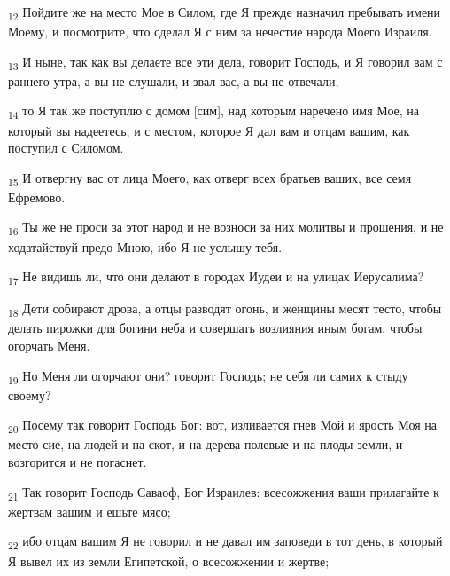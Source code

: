 \begin{tcolorbox}
\textsubscript{12} Пойдите же на место Мое в Силом, где Я прежде назначил пребывать имени Моему, и посмотрите, что сделал Я с ним за нечестие народа Моего Израиля.
\end{tcolorbox}
\begin{tcolorbox}
\textsubscript{13} И ныне, так как вы делаете все эти дела, говорит Господь, и Я говорил вам с раннего утра, а вы не слушали, и звал вас, а вы не отвечали, --
\end{tcolorbox}
\begin{tcolorbox}
\textsubscript{14} то Я так же поступлю с домом [сим], над которым наречено имя Мое, на который вы надеетесь, и с местом, которое Я дал вам и отцам вашим, как поступил с Силомом.
\end{tcolorbox}
\begin{tcolorbox}
\textsubscript{15} И отвергну вас от лица Моего, как отверг всех братьев ваших, все семя Ефремово.
\end{tcolorbox}
\begin{tcolorbox}
\textsubscript{16} Ты же не проси за этот народ и не возноси за них молитвы и прошения, и не ходатайствуй предо Мною, ибо Я не услышу тебя.
\end{tcolorbox}
\begin{tcolorbox}
\textsubscript{17} Не видишь ли, что они делают в городах Иудеи и на улицах Иерусалима?
\end{tcolorbox}
\begin{tcolorbox}
\textsubscript{18} Дети собирают дрова, а отцы разводят огонь, и женщины месят тесто, чтобы делать пирожки для богини неба и совершать возлияния иным богам, чтобы огорчать Меня.
\end{tcolorbox}
\begin{tcolorbox}
\textsubscript{19} Но Меня ли огорчают они? говорит Господь; не себя ли самих к стыду своему?
\end{tcolorbox}
\begin{tcolorbox}
\textsubscript{20} Посему так говорит Господь Бог: вот, изливается гнев Мой и ярость Моя на место сие, на людей и на скот, и на дерева полевые и на плоды земли, и возгорится и не погаснет.
\end{tcolorbox}
\begin{tcolorbox}
\textsubscript{21} Так говорит Господь Саваоф, Бог Израилев: всесожжения ваши прилагайте к жертвам вашим и ешьте мясо;
\end{tcolorbox}
\begin{tcolorbox}
\textsubscript{22} ибо отцам вашим Я не говорил и не давал им заповеди в тот день, в который Я вывел их из земли Египетской, о всесожжении и жертве;
\end{tcolorbox}
